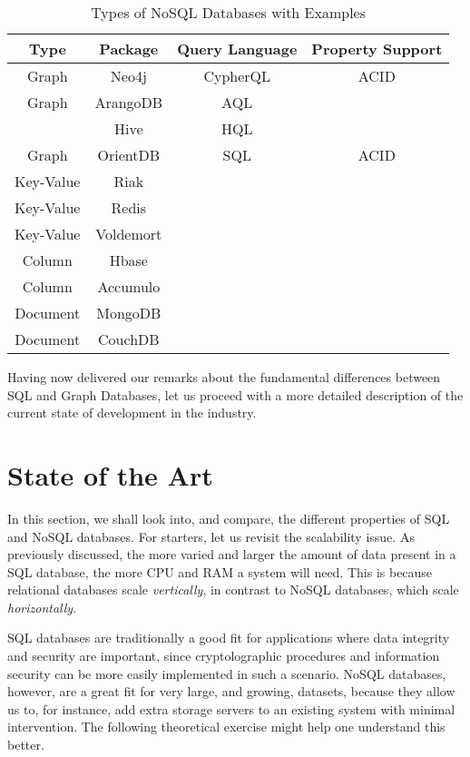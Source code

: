 \documentclass[10pt,        %
               a4paper,     %
               journal,     %
               ]{IEEEtran}
\begin{document}
\begin{table}[!t]
	\renewcommand{\arraystretch}{1.3} %
	\caption{Types of NoSQL Databases with Examples}
	\label{table_types_nosql}
	\centering
	\begin{tabular}{|c|c|c|c|}
		\hline
		Type & Package & Query Language & Property Support  \\
		\hline
		Graph & Neo4j & CypherQL & ACID \\
		\hline
		Graph & ArangoDB & AQL & \\
		\hline
		 & Hive & HQL & \\
		\hline
		Graph & OrientDB & SQL & ACID \\
		\hline
		Key-Value & Riak & &  \\
		\hline
		Key-Value & Redis & & \\
		\hline
		Key-Value & Voldemort & & \\
		\hline
		Column & Hbase & & \\
		\hline
		Column & Accumulo & & \\
		\hline
		Document & MongoDB & & \\
		\hline
		Document & CouchDB & & \\
		\hline
	\end{tabular}
\end{table}

Having now delivered our remarks about the fundamental differences between SQL and Graph Databases, let us proceed with a more detailed description of the current state of development in the industry.

\section{State of the Art}
In this section, we shall look into, and compare, the different properties of SQL and NoSQL databases. For starters, let us revisit the scalability issue. As previously discussed, the more varied and larger the amount of data present in a SQL database, the more CPU and RAM a system will need. This is because relational databases scale \textit{vertically}, in contrast to NoSQL databases, which scale \textit{horizontally}. \par
SQL databases are traditionally a good fit for applications where data integrity and security are important, since cryptolographic procedures and information security can be more easily implemented in such a scenario. NoSQL databases, however, are a great fit for very large, and growing, datasets, because they allow us to, for instance, add extra storage servers to an existing system with minimal intervention. The following theoretical exercise might help one understand this better. \par
\end{document}
